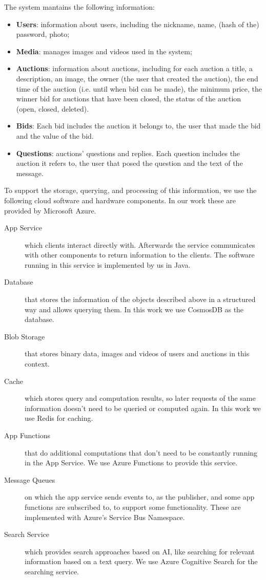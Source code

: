 \documentclass[runningheads]{llncs}
\begin{document}
The system mantains the following information:
\begin{itemize}
    \item \textbf{Users}: information about users, including the nickname, name, (hash of the) password, photo;
    \item \textbf{Media}: manages images and videos used in the system;
    \item \textbf{Auctions}: information about auctions, including for each auction a title, a description, an image, the owner (the user that created the auction), the end time of the auction (i.e. until when bid can be made), the minimum price, the winner bid for auctions that have been closed, the status of the auction (open, closed, deleted).
    \item \textbf{Bids}: Each bid includes the auction it belongs to, the user that made the bid and the value of the bid.
    \item \textbf{Questions}: auctions' questions and replies. Each question includes the auction it refers to, the user that posed the question and the text of the message. 
\end{itemize}

To support the storage, querying, and processing of this information, we use the following cloud software and hardware components. In our work these are provided by Microsoft Azure.

\begin{description}
    \item[App Service] which clients interact directly with. Afterwards the service communicates with other components to return information to the clients. The software running in this service is implemented by us in Java.
    \item[Database] that stores the information of the objects described above in a structured way and allows querying them. In this work we use CosmosDB as the database.
    \item[Blob Storage] that stores binary data, images and videos of users and auctions in this context.
    \item[Cache] which stores query and computation results, so later requests of the same information doesn't need to be queried or computed again. In this work we use Redis for caching.
    \item[App Functions] that do additional computations that don't need to be constantly running in the App Service. We use Azure Functions to provide this service.
    \item[Message Queues] on which the app service sends events to, as the publisher, and some app functions are subscribed to, to support some functionality. These are implemented with Azure's Service Bus Namespace.
    \item[Search Service] which provides search approaches based on AI, like searching for relevant information based on a text query. We use Azure Cognitive Search for the searching service.
    
\end{description}
\end{document}
